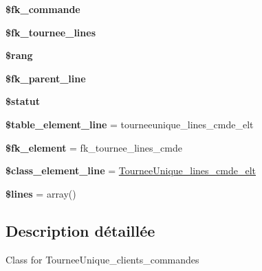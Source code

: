 \begin{DoxyCompactItemize}
\mbox{\label{classTourneeUnique__lines__cmde_ad6e5658e1deed0dda728a56fad49e821}} 
{\bfseries \$fk\+\_\+commande}
\item 
\mbox{\label{classTourneeUnique__lines__cmde_a8f7f22f63290a076219c8149a8cbe53c}} 
{\bfseries \$fk\+\_\+tournee\+\_\+lines}
\item 
\mbox{\label{classTourneeUnique__lines__cmde_ae63d519fb4a9bf3753891b2a238ad9c5}} 
{\bfseries \$rang}
\item 
\mbox{\label{classTourneeUnique__lines__cmde_ad2c8b056f9d56f3e0f5301a073337a95}} 
{\bfseries \$fk\+\_\+parent\+\_\+line}
\item 
\mbox{\label{classTourneeUnique__lines__cmde_a3d8c90ba67bd4f5eab6901171de8d72f}} 
{\bfseries \$statut}
\item 
\mbox{\label{classTourneeUnique__lines__cmde_ac9dd422e3db2b84a44083dd316e84317}} 
{\bfseries \$table\+\_\+element\+\_\+line} = \textquotesingle{}tourneeunique\+\_\+lines\+\_\+cmde\+\_\+elt\textquotesingle{}
\item 
\mbox{\label{classTourneeUnique__lines__cmde_a90e4d11082d77b55fe25cb7e498d4bcb}} 
{\bfseries \$fk\+\_\+element} = \textquotesingle{}fk\+\_\+tournee\+\_\+lines\+\_\+cmde\textquotesingle{}
\item 
\mbox{\label{classTourneeUnique__lines__cmde_ad9801ae367764ae39d55c9c5ad8eee7d}} 
{\bfseries \$class\+\_\+element\+\_\+line} = \textquotesingle{}\hyperlink{classTourneeUnique__lines__cmde__elt}{Tournee\+Unique\+\_\+lines\+\_\+cmde\+\_\+elt}\textquotesingle{}
\item 
\mbox{\label{classTourneeUnique__lines__cmde_a1ca143bdc0e58890c3511be3a36dc0aa}} 
{\bfseries \$lines} = array()
\end{DoxyCompactItemize}


\subsection{Description détaillée}
Class for Tournee\+Unique\+\_\+clients\+\_\+commandes 

